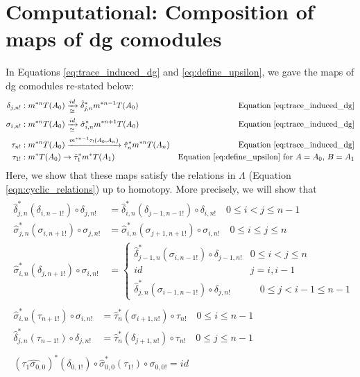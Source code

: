 \section{Computational: Composition of maps of dg comodules} 
\label{sec:composition_relations}
In Equations \ref{eq:trace_induced_dg} 
and \ref{eq:define_upsilon}, we gave the maps of 
dg comodules re-stated below:
\begin{align*}
\delta_{j,n!}&: 
m^{*n}T(A_0) \xrightarrow[\cong]{id}
\hat{\delta}_{j,n}^*m^{*n-1}T(A_0)
& \textrm{Equation \ref{eq:trace_induced_dg}}\\
\sigma_{i,n!}&:
m^{*n}T(A_0) \xrightarrow[\cong]{id}
\hat{\sigma}_{i,n}^*m^{*n+1}T(A_0)
& \textrm{Equation \ref{eq:trace_induced_dg}}\\
\tau_{n!}&: 
m^{*n}T(A_0) \xrightarrow{m^{*n-1}\tau_!(A_0,A_n)}
\hat{\tau}_n^*m^{*n}T(A_n)
& \textrm{Equation \ref{eq:trace_induced_dg}}\\
\tau_{1!}&: 
m^{*}T(A_0) \to{}
\hat{\tau}_1^*m^{*}T(A_1)
& \textrm{Equation \ref{eq:define_upsilon} 
for $A=A_0$, $B=A_1$}\\
\end{align*}
%
Here, we show that these maps satisfy the 
relations in $\Lambda$ (Equation 
\ref{eqn:cyclic_relations}) up to 
homotopy. More precisely, we will 
show that
\begin{subequations}\label{eq:strict}
\begin{align}
\begin{split}\label{eq:strict_1}
\hat{\delta}_{j,n}^*(\delta_{i,n-1!}) \circ \delta_{j,n!} 
&= 
\hat{\delta}_{i,n}^*(\delta_{j-1,n-1!}) \circ \delta_{i,n!} 
  \quad 0 \leq i < j \leq n-1 \\
\hat{\sigma}_{j,n}^*(\sigma_{i,n+1!}) \circ \sigma_{j,n!} 
&= 
\hat{\sigma}_{i,n}^*(\sigma_{j+1,n+1!}) \circ \sigma_{i,n!}
  \quad 0 \leq i \leq j \leq n \\
\hat{\sigma}_{i,n}^*(\delta_{j,n+1!}) \circ \sigma_{i,n!} 
&= 
  \begin{cases}
    \hat{\delta}_{j-1,n}^*(\sigma_{i,n-1!}) \circ \delta_{j-1,n!} 
      & 0 \leq i < j \leq n\\
    id & j = i, i-1\\
    \hat{\delta}_{j,n}^*(\sigma_{i-1,n-1!}) \circ \delta_{j,n!} 
      & \quad 0 \leq j < i-1 \leq n-1
   \end{cases}
\end{split}\\
\begin{split}\label{eq:strict_2}
\hat{\sigma}_{i,n}^*(\tau_{n+1!}) \circ \sigma_{i,n!} 
&= 
\hat{\tau}_n^*(\sigma_{i+1,n!}) \circ \tau_{n!}
  \quad 0 \leq i \leq n-1\\
\hat{\delta}_{j,n}^*(\tau_{n-1!}) \circ \delta_{j,n!} 
&= 
\hat{\tau}_n^*(\delta_{j+1,n!}) \circ \tau_{n!}
  \quad 0 \leq j \leq n-1
\end{split}\\
\begin{split}\label{eq:strict_3}
(\widehat{\tau_{1}\sigma_{0,0}})^*
  (\delta_{0,1!}) \circ
  \hat{\sigma}_{0,0}^*(\tau_{1!}) \circ 
  \sigma_{0,0!}
= id
\end{split} 
\end{align}
\end{subequations}
